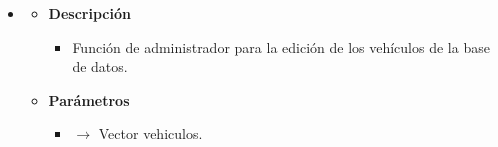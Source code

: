 \begin{itemize}
\begin{itemize}
\begin{itemize}
         	\end{itemize}
	\end{itemize}
    \item{}
	\begin{itemize}
		\item \textbf{Descripción}
        \begin{itemize}
			\item Función de administrador para la edición de los vehículos de la base de datos.
		\end{itemize}
        \item \textbf{Parámetros}
		\begin{itemize}
			\item {} $\rightarrow$ Vector vehiculos.
         	\end{itemize}
	\end{itemize}

\end{itemize}
\newpage